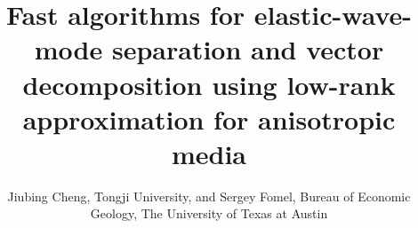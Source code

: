 
\newcommand{\rs}[1]{\mathstrut\mbox{\scriptsize\rm #1}}
\newcommand{\rr}[1]{\mbox{\rm #1}}

\title{Fast algorithms for elastic-wave-mode separation and vector decomposition using low-rank approximation for anisotropic media}


\renewcommand{\thefootnote}{\fnsymbol{footnote}}

\author{Jiubing Cheng, Tongji University, and Sergey Fomel, Bureau of Economic Geology, The University of Texas at Austin}

\maketitle











